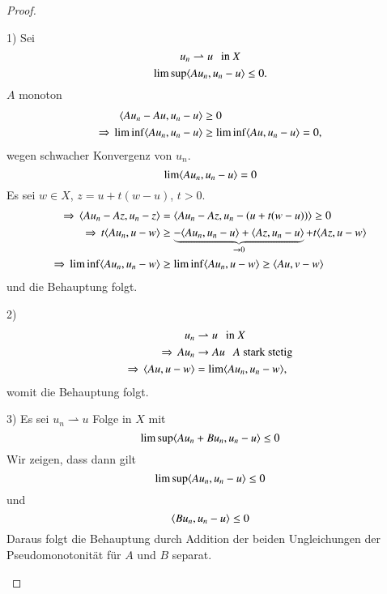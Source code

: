 \begin{proof}
    \begin{description}
        \item{1)}
        Sei
        \[
            u_n\rightharpoonup u \hspace{.25cm}\text{in } X
        \]
        \[
            \limsup \langle Au_n , u_n - u \rangle \leq 0.
        \]
        $A$ monoton
        \begin{align*}
            \langle Au_n- Au, u_n -u \rangle & \geq 0 \\
            \Rightarrow \, \liminf\langle Au_n , u_n - u \rangle &\geq \liminf \langle Au, u_n - u \rangle = 0,
        \end{align*}
        wegen schwacher Konvergenz von $u_n$.
        \[
            \lim \langle Au_n , u_n - u\rangle =0
        \]
        Es sei $w\in X$, $z=u+t(w-u)$, $t>0$.
        \begin{align*}
            \Rightarrow \, \langle Au_n - Az, u_n - z \rangle &= \langle Au_n - Az , u_n -(u+t(w-u)) \rangle \geq 0\\
            \Rightarrow \, t\langle Au_n , u-w \rangle &\geq \underbrace{-\langle Au_n , u_n - u\rangle + \langle Az, u_n - u
                \rangle}_{\rightarrow 0} + t\langle Az, u-w\rangle\\
            \Rightarrow \, \liminf \langle Au_n , u_n - w \rangle &\geq \liminf \langle Au_n, u-w \rangle \geq \langle Au, v-w
            \rangle
        \end{align*}
        und die Behauptung folgt.
        \item{2)}
        \begin{align*}
            u_n&\rightharpoonup u \hspace{.25cm} \text{in } X\\
            \Rightarrow \, Au_n&\rightarrow Au \hspace{.25cm} \text{$A$ stark stetig}\\
            \Rightarrow \, \langle Au,u-w\rangle &= \lim \langle Au_n ,u_n - w \rangle,
        \end{align*}
        womit die Behauptung folgt.
        \item{3)}
        Es sei $u_n \rightharpoonup u$ Folge in $X$ mit
        \[
            \limsup \langle Au_n + Bu_n, u_n -u\rangle \leq 0
        \]
        Wir zeigen, dass dann gilt
        \[
            \limsup\langle Au_n , u_n -u\rangle \leq 0
        \]
        und
        \[
            \langle Bu_n, u_n - u \rangle \leq 0
        \]
        Daraus folgt die Behauptung durch Addition der beiden Ungleichungen der Pseudomonotonität für
        $A$ und $B$ separat.
        

\end{description}
\end{proof}
